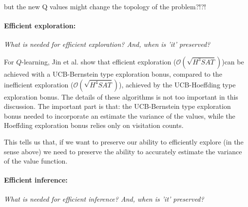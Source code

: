 {\color{red}but the new Q values might change the topology of the problem?!?!}


\paragraph{Efficient exploration:} \textsl{What is needed for efficient exploration? And, when is 'it' preserved?}

For $Q$-learning, Jin et al. \cite{Bubeck2018} show that efficient exploration ($\mathcal O(\sqrt{H^3SAT})$)\footnotemark[13] can be
achieved with a UCB-Bernstein type exploration bonus, compared to the inefficient exploration ($\mathcal O(\sqrt{H^4SAT})$),
achieved by the UCB-Hoeffding type exploration bonus. The details of these algorithms is not too important in this discussion.
The important part is that: the UCB-Bernstein type exploration bonus needed to incorporate an
estimate the variance of the values, while the Hoeffding exploration bonus relies only on visitation counts.


This tells us that, if we want to preserve our ability to efficiently explore (in the sense above) we need to preserve the  ability to accurately estimate the variance of the value function.



\paragraph{Efficient inference:} \textsl{What is needed for efficient inference? And, when is 'it' preserved?}

